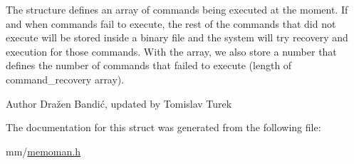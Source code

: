 The structure defines an array of commands being executed at the moment. If and when commands fail to execute, the rest of the commands that did not execute will be stored inside a binary file and the system will try recovery and execution for those commands. With the array, we also store a number that defines the number of commands that failed to execute (length of command\+\_\+recovery array). \begin{DoxyAuthor}{Author}
Dražen Bandić, updated by Tomislav Turek 
\end{DoxyAuthor}


The documentation for this struct was generated from the following file\+:\begin{DoxyCompactItemize}
\item 
mm/\hyperlink{memoman_8h}{memoman.\+h}\end{DoxyCompactItemize}
